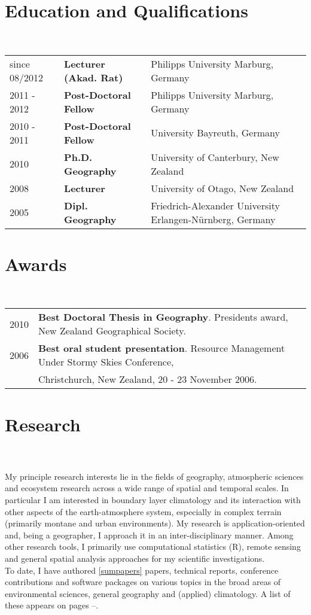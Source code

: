 \documentclass[a4paper,11pt]{article}
\begin{document}
\maketitle
\section{Education and Qualifications}
\hrulefill \\
\begin{tabular}{lll}\\
since 08/2012 & \textbf{Lecturer (Akad. Rat)} & Philipps University Marburg, Germany\\
2011 - 2012 & \textbf{Post-Doctoral Fellow} & Philipps University Marburg, Germany\\
2010 - 2011 & \textbf{Post-Doctoral Fellow} & University Bayreuth, Germany\\
2010 & \textbf{Ph.D. Geography} & University of Canterbury, New Zealand\\
2008 & \textbf{Lecturer} & University of Otago, New Zealand\\
2005 & \textbf{Dipl. Geography} & Friedrich-Alexander University Erlangen-N\"urnberg, Germany
\end{tabular}

\section{Awards}
\hrulefill \\
\begin{tabular}{lll}\\
2010 & \textbf{Best Doctoral Thesis in Geography}. Presidents award, New Zealand Geographical Society.\\
2006 & \textbf{Best oral student presentation}. Resource Management Under Stormy Skies Conference, \\
	 & Christchurch, New Zealand, 20 - 23 November 2006.
\end{tabular}

\section{Research}
\hrulefill \\
\hfill \\
My principle research interests lie in the fields of geography, atmospheric sciences and ecosystem research across a wide range of spatial and temporal scales. In particular I am interested in boundary layer climatology and its interaction with other aspects of the earth-atmosphere system, especially in complex terrain (primarily montane and urban environments). My research is application-oriented and, being a geographer, I approach it in an inter-disciplinary manner. Among other research tools, I primarily use computational statistics (R), remote sensing and general spatial analysis approaches for my scientific investigations.\\
To date, I have authored \ref{sumpapers} papers, technical reports, conference contributions and software packages on various topics in the broad areas of environmental sciences, general geography and (applied) climatology. A list of these appears on pages \pageref{papersstart}--\pageref{papersend}.
\end{document}
